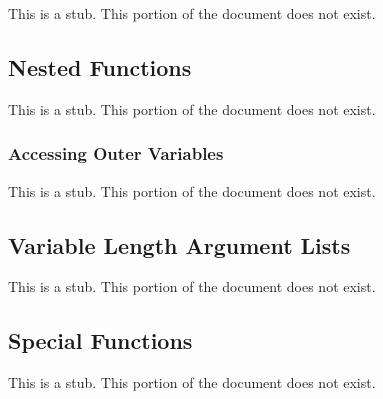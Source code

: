 This is a stub.  This portion of the document does not exist.

\subsection{Nested Functions}
\label{Nested_Functions}

This is a stub.  This portion of the document does not exist.

\subsubsection{Accessing Outer Variables}
\label{Accessing_Outer_Variables}

This is a stub.  This portion of the document does not exist.

\subsection{Variable Length Argument Lists}
\label{Variable_Length_Argument_Lists}

This is a stub.  This portion of the document does not exist.

\subsection{Special Functions}
\label{Special_Functions}

This is a stub.  This portion of the document does not exist.
